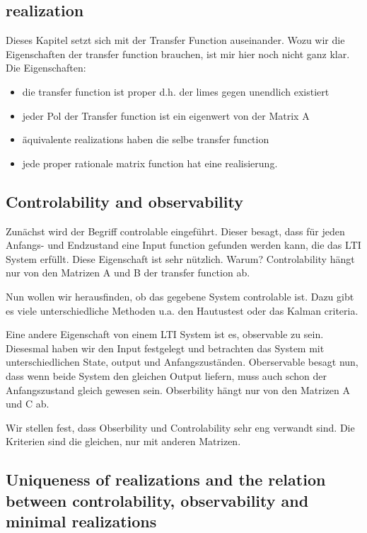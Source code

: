 \documentclass[]{article}
\begin{document}
\subsection{realization}
Dieses Kapitel setzt sich mit der Transfer Function auseinander. Wozu wir die Eigenschaften der transfer function brauchen, ist mir hier noch nicht ganz klar. Die Eigenschaften: 
\begin{itemize}
	\item die transfer function ist proper d.h. der limes gegen unendlich existiert
	\item jeder Pol der Transfer function ist ein eigenwert von der Matrix A
	\item äquivalente realizations haben die selbe transfer function
	\item jede proper rationale matrix function hat eine realisierung. 
\end{itemize}

\subsection{Controlability and observability}
Zunächst wird der Begriff controlable eingeführt. Dieser besagt, dass für jeden Anfangs- und Endzustand eine Input function gefunden werden kann, die das LTI System erfüllt. Diese Eigenschaft ist sehr nützlich. Warum? Controlability hängt nur von den Matrizen A und B der transfer function ab. 

Nun wollen wir herausfinden, ob das gegebene System controlable ist. Dazu gibt es viele unterschiedliche Methoden u.a. den Hautustest oder das Kalman criteria. 


Eine andere Eigenschaft von einem LTI System ist es, observable zu sein. Diesesmal haben wir den Input festgelegt und betrachten das System mit unterschiedlichen State, output und Anfangszuständen. Oberservable besagt nun, dass wenn beide System den gleichen Output liefern, muss auch schon der Anfangszustand gleich gewesen sein. Obserbility hängt nur von den Matrizen A und C ab. 

Wir stellen fest, dass Obserbility und Controlability sehr eng verwandt sind. Die Kriterien sind die gleichen, nur mit anderen Matrizen. 

\subsection{Uniqueness of realizations and the relation between controlability, observability and minimal realizations}
\end{document}
